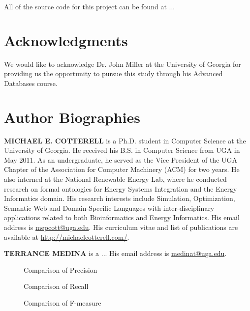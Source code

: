 \documentclass[letterpaper,twocolumn,12pt]{article}
\begin{document}
All of the source code for this project can be found at ...

\section*{Acknowledgments}

We would like to acknowledge Dr. John Miller at the University of Georgia for providing us the opportunity to pursue this study through his Advanced Databases course. 

%

 

\section*{Author Biographies} 
\vspace{8 pt}
\noindent \textbf{MICHAEL E. COTTERELL} is a Ph.D. student in Computer Science at the University of Georgia. 
He received his B.S. in Computer Science from UGA in May 2011. 
As an undergraduate, he served as the Vice President of the UGA Chapter of the Association for Computer Machinery (ACM) for two years. 
He also interned at the National Renewable Energy Lab, where he conducted research on formal ontologies for Energy Systems Integration and the Energy Informatics domain. 
His research interests include Simulation, Optimization, Semantic Web and Domain-Specific Languages with inter-disciplinary applications related to both Bioinformatics and Energy Informatics.
His email address is \href{mailto:mepcott@uga.edu}{mepcott@uga.edu}.
His curriculum vitae and list of publications are available at \url{http://michaelcotterell.com/}.

\vspace{8 pt}
\noindent \textbf{TERRANCE MEDINA} is a ... His email address is \href{mailto:medinat@uga.edu}{medinat@uga.edu}.




\onecolumn
\begin{sidewaysfigure}
\centering
\tiny{}
\caption{Comparison of Precision}
\label{fig:precision}
\end{sidewaysfigure}

\begin{sidewaysfigure}
\centering
\tiny{}
\caption{Comparison of Recall}
\label{fig:recall}
\end{sidewaysfigure}

\begin{sidewaysfigure}
\centering
\tiny{}
\caption{Comparison of F-measure}
\label{fig:fmeasure}
\end{sidewaysfigure}
\end{document}
